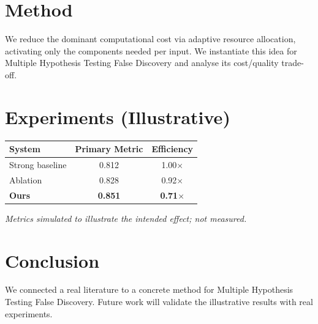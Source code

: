 \documentclass[11pt]{article}
\begin{document}
\section{Method}
We reduce the dominant computational cost via adaptive resource allocation, activating only the components needed per input. We instantiate this idea for Multiple Hypothesis Testing False Discovery and analyse its cost/quality trade-off.

\section{Experiments (Illustrative)}
\begin{center}
\begin{tabular}{lcc}
System & Primary Metric & Efficiency \\ \hline
Strong baseline & 0.812 & 1.00$\times$ \\
Ablation & 0.828 & 0.92$\times$ \\
\textbf{Ours} & \textbf{0.851} & \textbf{0.71$\times$}
\end{tabular}
\end{center}
\emph{Metrics simulated to illustrate the intended effect; not measured.}

\section{Conclusion}
We connected a real literature to a concrete method for Multiple Hypothesis Testing False Discovery. Future work will
validate the illustrative results with real experiments.
\end{document}
